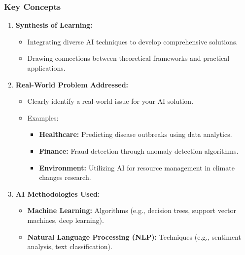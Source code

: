\documentclass[aspectratio=169]{beamer}
\begin{document}
\begin{frame}[fragile]
    \frametitle{Key Concepts}
    \begin{enumerate}
        \item \textbf{Synthesis of Learning:}
        \begin{itemize}
            \item Integrating diverse AI techniques to develop comprehensive solutions.
            \item Drawing connections between theoretical frameworks and practical applications.
        \end{itemize}
        
        \item \textbf{Real-World Problem Addressed:}
        \begin{itemize}
            \item Clearly identify a real-world issue for your AI solution.
            \item Examples:
            \begin{itemize}
                \item \textbf{Healthcare:} Predicting disease outbreaks using data analytics.
                \item \textbf{Finance:} Fraud detection through anomaly detection algorithms.
                \item \textbf{Environment:} Utilizing AI for resource management in climate changes research.
            \end{itemize}
        \end{itemize}
        
        \item \textbf{AI Methodologies Used:}
        \begin{itemize}
            \item \textbf{Machine Learning:} Algorithms (e.g., decision trees, support vector machines, deep learning).
            \item \textbf{Natural Language Processing (NLP):} Techniques (e.g., sentiment analysis, text classification).
        \end{itemize}
    \end{enumerate}
\end{frame}
\end{document}
